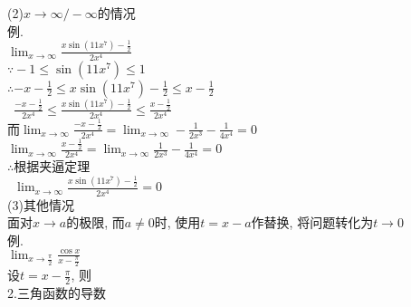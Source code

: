 (2)$x\to\infty/-\infty$的情况\\
例.\\
\phantom{例}$\displaystyle\lim_{x\to\infty}\frac{x\sin(11x^7)-\frac{1}{2}}{2x^4}$\\
$\displaystyle\because-1\leqslant\sin(11x^7)\leqslant1$\\
$\displaystyle\therefore-x-\frac{1}{2}\leqslant x\sin(11x^7)-\frac{1}{2}\leqslant x-\frac{1}{2}$\\
$\displaystyle\phantom{\therefore}\frac{-x-\frac{1}{2}}{2x^4}\leqslant\frac{x\sin(11x^7)-\frac{1}{2}}{2x^4}\leqslant\frac{x-\frac{1}{2}}{2x^4}$\\
而$\displaystyle\lim_{x\to\infty}\frac{-x-\frac{1}{2}}{2x^4}=\lim_{x\to\infty}-\frac{1}{2x^3}-\frac{1}{4x^4}=0$\\
\phantom{而}$\displaystyle\lim_{x\to\infty}\frac{x-\frac{1}{2}}{2x^4}=\lim_{x\to\infty}\frac{1}{2x^3}-\frac{1}{4x^4}=0$\\
$\displaystyle\therefore$根据夹逼定理\\
$\displaystyle\phantom{\therefore}\lim_{x\to\infty}\frac{x\sin(11x^7)-\frac{1}{2}}{2x^4}=0$\\[2ex]

(3)其他情况\\
面对$x\to a$的极限, 而$a\neq 0$时, 使用$t=x-a$作替换, 将问题转化为$t\to 0$\\
例.\\
\phantom{例}$\displaystyle\lim_{x\to\frac{\pi}{2}}\frac{\cos x}{x-\frac{\pi}{2}}$\\
设$t=x-\frac{\pi}{2}$, 则\\

2.三角函数的导数\\[2ex]
\\[2ex]
\\[2ex]
\\[2ex]
\\[2ex]
\\[2ex]
\\[2ex]
